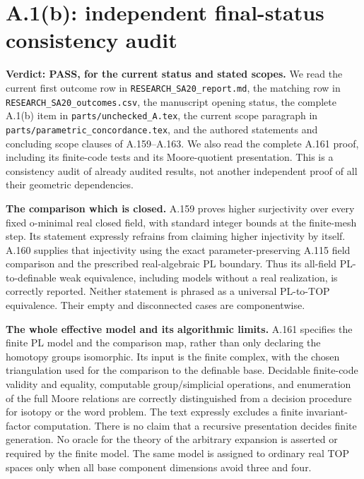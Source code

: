 \section*{A.1(b): independent final-status consistency audit}

\textbf{Verdict: PASS, for the current status and stated scopes.}\quad
We read the current first outcome row in
\texttt{RESEARCH\_SA20\_report.md}, the matching row in
\texttt{RESEARCH\_SA20\_outcomes.csv}, the manuscript opening status,
the complete A.1(b) item in \texttt{parts/unchecked\_A.tex}, the
current scope paragraph in \texttt{parts/parametric\_concordance.tex},
and the authored statements and concluding scope clauses of
A.159--A.163.  We also read the complete A.161 proof, including its
finite-code tests and its Moore-quotient presentation.
This is a consistency audit of already audited results, not another
independent proof of all their geometric dependencies.

\textbf{The comparison which is closed.}\quad
A.159 proves higher surjectivity over every fixed o-minimal real closed
field, with standard integer bounds at the finite-mesh step.  Its
statement expressly refrains from claiming higher injectivity by
itself.  A.160 supplies that injectivity using the exact
parameter-preserving A.115 field comparison and the prescribed
real-algebraic PL boundary.  Thus its all-field PL-to-definable weak
equivalence, including models without a real realization, is correctly
reported.  Neither statement is phrased as a universal PL-to-TOP
equivalence.  Their empty and disconnected cases are componentwise.

\textbf{The whole effective model and its algorithmic limits.}\quad
A.161 specifies the finite PL model and the comparison map, rather
than only declaring the homotopy groups isomorphic.  Its input is the
finite complex, with the chosen triangulation used for the comparison
to the definable base.  Decidable finite-code validity and equality,
computable group/simplicial operations, and enumeration of the full
Moore relations are correctly distinguished from a decision procedure
for isotopy or the word problem.  The text expressly excludes a finite
invariant-factor computation.  There is no claim that a recursive
presentation decides finite generation.  No oracle for the theory of
the arbitrary expansion is asserted or required by the finite model.
The same model is assigned to ordinary real TOP spaces only when all
base component dimensions avoid three and four.

